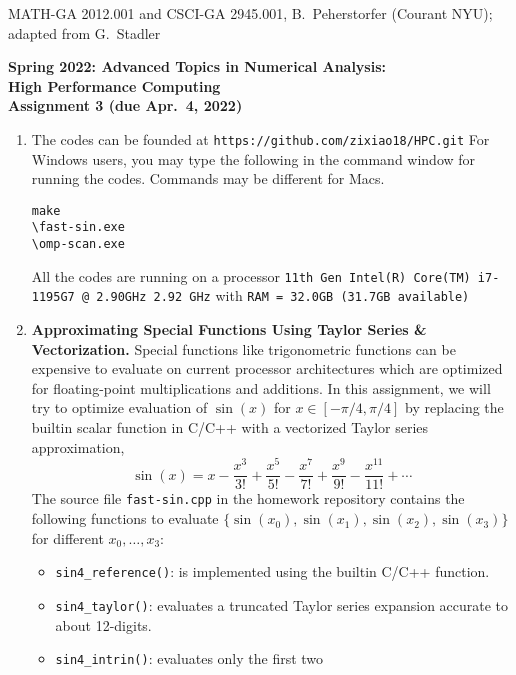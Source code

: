 \documentclass[12pt]{article}
\begin{document}
\begin{center}
  \vspace*{-2cm}
{\small MATH-GA 2012.001 and CSCI-GA 2945.001, B.~Peherstorfer (Courant NYU); adapted from G.~Stadler}\end{center}
\vspace*{.5cm}
\begin{center}
\large \textbf{%
Spring 2022: Advanced Topics in Numerical Analysis: \\
High Performance Computing \\
Assignment 3 (due Apr.\ 4, 2022) }
\end{center}

\begin{enumerate}
\addtocounter{enumi}{-1}
\item The codes can be founded at \texttt{https://github.com/zixiao18/HPC.git}
For Windows users, you may type the following in the command window for running the codes. Commands may be different for Macs.
\begin{verbatim}
make
\fast-sin.exe
\omp-scan.exe
\end{verbatim}
All the codes are running on a processor \texttt{11th Gen Intel(R) Core(TM) i7-1195G7 @ 2.90GHz   2.92 GHz} with \texttt{RAM = 32.0GB (31.7GB available)}
  \item {\bf Approximating Special Functions Using Taylor Series \& Vectorization.}
    Special functions like trigonometric functions can be expensive to
    evaluate on current processor architectures which are optimized for
    floating-point multiplications and additions. In this assignment, we
    will try to optimize evaluation of $\sin(x)$ for $x\in[-\pi/4,
    \pi/4]$ by replacing the builtin scalar function in C/C++ with a
    vectorized Taylor series approximation,
    \[
      \sin(x) = x - \frac{x^3}{3!} + \frac{x^5}{5!} - \frac{x^7}{7!} + \frac{x^9}{9!} - \frac{x^{11}}{11!} + \cdots
    \]
    The source file \texttt{fast-sin.cpp} in the homework repository
    contains the following functions to evaluate $\{\sin(x_0),
    \sin(x_1), \sin(x_2), \sin(x_3)\}$ for different $x_0,\ldots,x_3$:
    \begin{itemize}
      \item \texttt{sin4\_reference()}: is implemented using the builtin C/C++ function.
      \item \texttt{sin4\_taylor()}: evaluates a truncated Taylor series expansion accurate to about 12-digits.
      \item \texttt{sin4\_intrin()}: evaluates only the first two

\end{itemize}
\end{enumerate}
\end{document}

